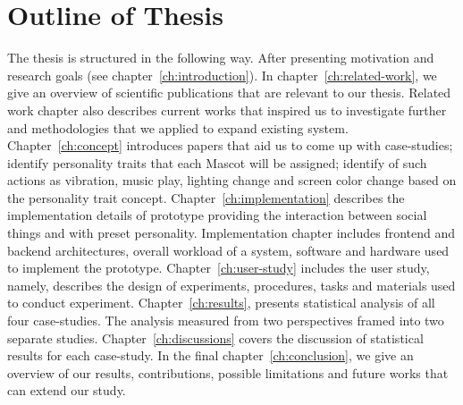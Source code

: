 \section{Outline of Thesis}
\label{sec:outline-of-thesis}
The thesis is structured in the following way.
After presenting motivation and research goals (see chapter~\ref{ch:introduction}).
In chapter~\ref{ch:related-work}, we give an overview of scientific publications that are relevant to our thesis.
Related work chapter also describes current works that inspired us to investigate further
and methodologies that we applied to expand existing system.
Chapter~\ref{ch:concept} introduces papers that aid us to come up with case-studies;
identify personality traits that each Mascot will be assigned;
identify of such actions as vibration, music play, lighting change
and screen color change based on the personality trait concept.
Chapter~\ref{ch:implementation} describes the implementation details of prototype providing the
interaction between social things and with preset personality.
Implementation chapter includes frontend and backend architectures,
overall workload of a system, software and hardware used to implement the prototype.
Chapter~\ref{ch:user-study} includes the user study, namely, describes the design of
experiments, procedures, tasks and materials used to conduct experiment.
Chapter~\ref{ch:results}, presents statistical analysis of all four case-studies.
The analysis measured from two perspectives framed into two separate studies.
Chapter~\ref{ch:discussions} covers the discussion of statistical results for each case-study.
In the final chapter~\ref{ch:conclusion}, we give an overview of our results, contributions,
possible limitations and future works that can extend our study.